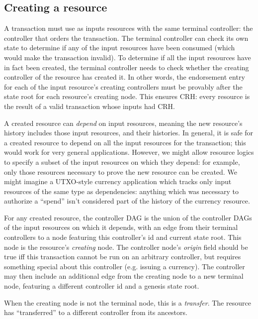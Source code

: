 \documentclass[a4paper,USenglish,cleveref, autoref, thm-restate, anonymous]{lipics-v2021}
\begin{document}
\subsection{Creating a resource}
A transaction must use as inputs resources with the same terminal controller: the controller that orders the transaction. 
The terminal controller can check its own state to determine if any of the input resources have been consumed (which would make the transaction invalid).
To determine if all the input resources have in fact been created, the terminal controller needs to check whether the creating controller of the resource has created it. 
In other words, the endorsement entry for each of the input resource's creating controllers must be provably after the state root for each resource's creating node. 
This ensures CRH: every resource is the result of a valid transaction whose inputs had CRH. 

A created resource can \textit{depend} on input resources, meaning the new resource's history includes those input resources, and their histories. 
In general, it is safe for a created resource to depend on all the input resources for the transaction; this would work for very general applications.
However, we might allow resource logics to specify a subset of the input resources on which they depend: for example, only those resources necessary to prove the new resource can be created. 
We might imagine a UTXO-style currency application which tracks only input resources of the same type as dependencies: anything which was necessary to authorize a ``spend'' isn't considered part of the history of the currency resource.

For any created resource, the controller DAG is the union of the controller DAGs of the input resources on which it depends, with an edge from their terminal controllers to a node featuring this controller's id and current state root. 
This node is the resource's \textit{creating} node. 
The controller node's \textit{origin} field should be true iff this transaction cannot be run on an arbitrary controller, but requires something special about this controller (e.g. issuing a currency). 
The controller may then include an additional edge from the creating node to a new terminal node, featuring a different controller id and a genesis state root. 

When the creating node is not the terminal node, this is a \textit{transfer}.
The resource has ``transferred'' to a different controller from its ancestors. 
\end{document}
